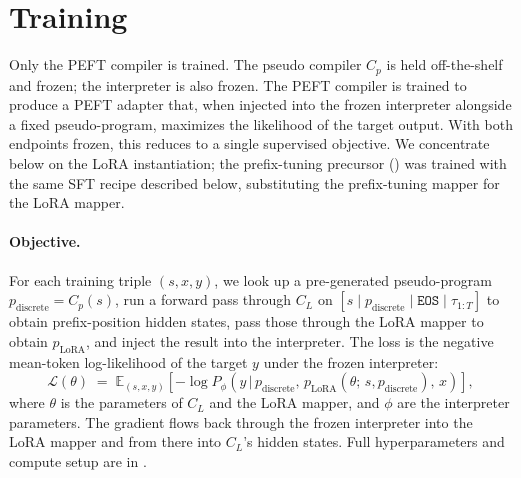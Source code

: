 \documentclass{article}
\theoremstyle{plain}
\theoremstyle{definition}
\theoremstyle{remark}
\begin{document}
\section{Training}
\label{sec:training}

Only the PEFT compiler is trained. The pseudo compiler $C_p$ is held off-the-shelf and frozen; the interpreter is also frozen. The PEFT compiler is trained to produce a PEFT adapter that, when injected into the frozen interpreter alongside a fixed pseudo-program, maximizes the likelihood of the target output. With both endpoints frozen, this reduces to a single supervised objective. We concentrate below on the LoRA instantiation; the prefix-tuning precursor () was trained with the same SFT recipe described below, substituting the prefix-tuning mapper for the LoRA mapper.

\paragraph{Objective.}
For each training triple $(s, x, y)$, we look up a pre-generated pseudo-program $p_{\text{discrete}} = C_p(s)$, run a forward pass through $C_L$ on $[s \mid p_{\text{discrete}} \mid \texttt{EOS} \mid \tau_{1{:}T}]$ to obtain prefix-position hidden states, pass those through the LoRA mapper to obtain $p_{\text{LoRA}}$, and inject the result into the interpreter. The loss is the negative mean-token log-likelihood of the target $y$ under the frozen interpreter:
\begin{equation}
\label{eq:objective}
\mathcal{L}(\theta) \;=\; \mathbb{E}_{(s,x,y)}\!\left[ - \log P_{\phi}\!\left( y \,\big|\, p_{\text{discrete}},\, p_{\text{LoRA}}(\theta;\, s, p_{\text{discrete}}),\, x \right) \right],
\end{equation}
where $\theta$ is the parameters of $C_L$ and the LoRA mapper, and $\phi$ are the interpreter parameters. The gradient flows back through the frozen interpreter into the LoRA mapper and from there into $C_L$'s hidden states. Full hyperparameters and compute setup are in .

\end{document}
